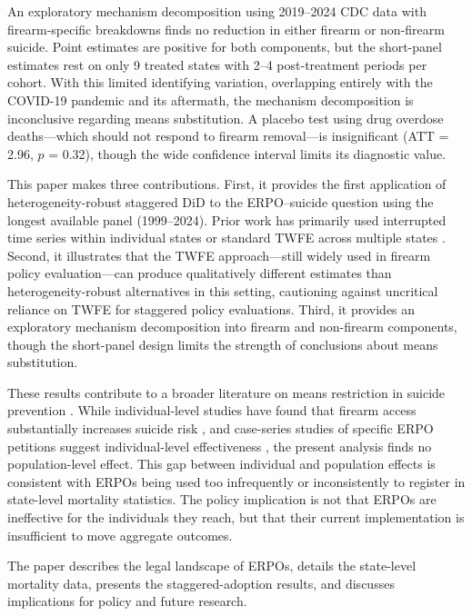 \documentclass[12pt]{article}
\begin{document}
An exploratory mechanism decomposition using 2019--2024 CDC data with firearm-specific breakdowns finds no reduction in either firearm or non-firearm suicide. Point estimates are positive for both components, but the short-panel estimates rest on only 9 treated states with 2--4 post-treatment periods per cohort. With this limited identifying variation, overlapping entirely with the COVID-19 pandemic and its aftermath, the mechanism decomposition is inconclusive regarding means substitution. A placebo test using drug overdose deaths---which should not respond to firearm removal---is insignificant (ATT = 2.96, $p$ = 0.32), though the wide confidence interval limits its diagnostic value.

This paper makes three contributions. First, it provides the first application of heterogeneity-robust staggered DiD to the ERPO--suicide question using the longest available panel (1999--2024). Prior work has primarily used interrupted time series within individual states \citep{humphreys2019evaluating} or standard TWFE across multiple states \citep{kivisto2018firearm}. Second, it illustrates that the TWFE approach---still widely used in firearm policy evaluation---can produce qualitatively different estimates than heterogeneity-robust alternatives in this setting, cautioning against uncritical reliance on TWFE for staggered policy evaluations. Third, it provides an exploratory mechanism decomposition into firearm and non-firearm components, though the short-panel design limits the strength of conclusions about means substitution.

These results contribute to a broader literature on means restriction in suicide prevention \citep{mann2005suicide, barber2008reducing, daigle2005suicide}. While individual-level studies have found that firearm access substantially increases suicide risk \citep{anglemyer2014accessibility, kellermann1992suicide}, and case-series studies of specific ERPO petitions suggest individual-level effectiveness \citep{swanson2014implementation, swanson2019criminal}, the present analysis finds no population-level effect. This gap between individual and population effects is consistent with ERPOs being used too infrequently or inconsistently to register in state-level mortality statistics. The policy implication is not that ERPOs are ineffective for the individuals they reach, but that their current implementation is insufficient to move aggregate outcomes.

The paper describes the legal landscape of ERPOs, details the state-level mortality data, presents the staggered-adoption results, and discusses implications for policy and future research.
\end{document}
